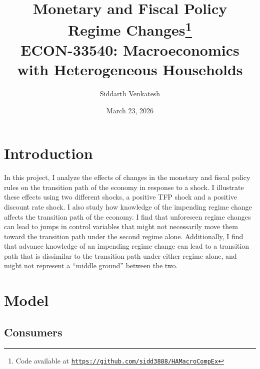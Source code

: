 \documentclass[11pt]{article}
\title{
    Monetary and Fiscal Policy Regime Changes\footnote{Code available at \href{https://github.com/sidd3888/HAMacroCompEx}{\texttt{https://github.com/sidd3888/HAMacroCompEx}}}\\
    \Large ECON-33540: Macroeconomics with Heterogeneous Households
}
\author{Siddarth Venkatesh}
\date{March 23, 2026}
\begin{document}
\maketitle


\section{Introduction}

In this project, I analyze the effects of changes in the monetary and fiscal policy rules on the transition path of the economy in response to a shock. I illustrate these effects using two different shocks, a positive TFP shock and a positive discount rate shock. I also study how knowledge of the impending regime change affects the transition path of the economy. I find that unforeseen regime changes can lead to jumps in control variables that might not necessarily move them toward the transition path under the second regime alone. Additionally, I find that advance knowledge of an impending regime change can lead to a transition path that is dissimilar to the transition path under either regime alone, and might not represent a ``middle ground'' between the two.

\section{Model}

\subsection{Consumers}
\end{document}
